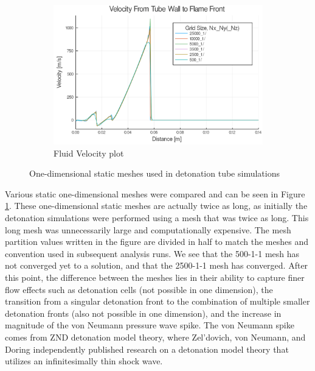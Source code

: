 \begin{figure} \ContinuedFloat
    
    \begin{subfigure}[]{\textwidth}
        \centering
        \includegraphics[width=\textwidth]{./figs/static1d/u.png}
        \caption{Fluid Velocity plot}
    \end{subfigure}

    \caption{One-dimensional static meshes used in detonation tube simulations}
    \label{fig:1dstatic}
\end{figure}

Various static one-dimensional meshes were compared and can be seen in Figure \ref{fig:1dstatic}. These one-dimensional static meshes are actually twice as long, as initially the detonation simulations were performed using a mesh that was twice as long. This long mesh was unnecessarily large and computationally expensive. The mesh partition values written in the figure are divided in half to match the meshes and convention used in subsequent analysis runs. We see that the 500-1-1 mesh has not converged yet to a solution, and that the 2500-1-1 mesh has converged. After this point, the difference between the meshes lies in their ability to capture finer flow effects such as detonation cells (not possible in one dimension), the transition from a singular detonation front to the combination of multiple smaller detonation fronts (also not possible in one dimension), and the increase in magnitude of the von Neumann pressure wave spike. The von Neumann spike comes from ZND detonation model theory, where Zel'dovich, von Neumann, and Doring independently published research on a detonation model theory that utilizes an infinitesimally thin shock wave. 


